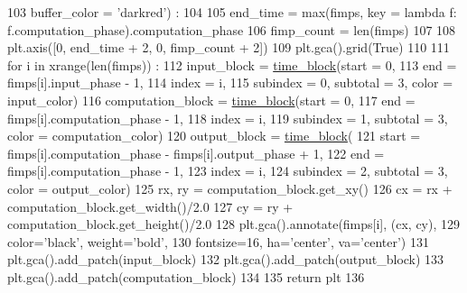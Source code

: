 \begin{DoxyCode}
103     buffer\_color = \textcolor{stringliteral}{'darkred'}) :
104 
105     end\_time = max(fimps, key = \textcolor{keyword}{lambda} f: f.computation\_phase).computation\_phase
106     fimp\_count = len(fimps)
107 
108     plt.axis([0, end\_time + 2, 0, fimp\_count + 2])
109     plt.gca().grid(\textcolor{keyword}{True})
110 
111     \textcolor{keywordflow}{for} i \textcolor{keywordflow}{in} xrange(len(fimps)) :
112       input\_block = \hyperlink{namespacesylva_1_1misc_1_1plot_a35e705ad0728f0ff413c9d4033bff7b4}{time\_block}(start = 0,
113         end = fimps[i].input\_phase - 1,
114         index = i,
115         subindex = 0, subtotal = 3, color = input\_color)
116       computation\_block = \hyperlink{namespacesylva_1_1misc_1_1plot_a35e705ad0728f0ff413c9d4033bff7b4}{time\_block}(start = 0,
117         end = fimps[i].computation\_phase - 1,
118         index = i,
119         subindex = 1, subtotal = 3, color = computation\_color)
120       output\_block = \hyperlink{namespacesylva_1_1misc_1_1plot_a35e705ad0728f0ff413c9d4033bff7b4}{time\_block}(
121         start = fimps[i].computation\_phase - fimps[i].output\_phase + 1,
122         end = fimps[i].computation\_phase - 1,
123         index = i,
124         subindex = 2, subtotal = 3, color = output\_color)
125       rx, ry = computation\_block.get\_xy()
126       cx = rx + computation\_block.get\_width()/2.0
127       cy = ry + computation\_block.get\_height()/2.0
128       plt.gca().annotate(fimps[i], (cx, cy),
129         color=\textcolor{stringliteral}{'black'}, weight=\textcolor{stringliteral}{'bold'},
130         fontsize=16, ha=\textcolor{stringliteral}{'center'}, va=\textcolor{stringliteral}{'center'})
131       plt.gca().add\_patch(input\_block)
132       plt.gca().add\_patch(output\_block)
133       plt.gca().add\_patch(computation\_block)
134 
135     \textcolor{keywordflow}{return} plt
136 
\end{DoxyCode}
\mbox{\label{namespacesylva_1_1misc_1_1plot_a407cb01fd5820f94e98a438d04391c6e}} 
